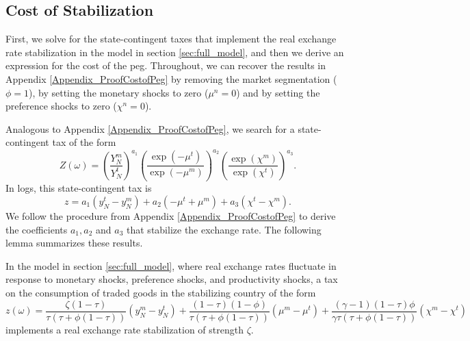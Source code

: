 \subsection{Cost of Stabilization
  \label{Appendix_ProofCostofPeg_FullModel}}

First, we solve for the state-contingent taxes that implement the real
exchange rate stabilization in the model in section
\ref{sec:full_model}, and then we derive an expression for the cost of
the peg. Throughout, we can recover the results in Appendix
\ref{Appendix_ProofCostofPeg} by removing the market segmentation
($\phi = 1$), by setting the monetary shocks to zero ($\mu^n = 0$) and
by setting the preference shocks to zero ($\chi^n = 0$).

Analogous to Appendix \ref{Appendix_ProofCostofPeg}, we search for a
state-contingent tax of the form
\begin{equation*}
  Z(\omega) = \left( \frac{Y_N^m}{Y_N^t} \right)^{a_1}
  \left( \frac{\exp \left( -\mu^t \right)}{\exp \left( -\mu^m \right)}\right)^{a_2} 
  \left( \frac{\exp \left( \chi^m \right)}{\exp \left( \chi^t \right)} \right)^{a_3}.
\end{equation*}
In logs, this state-contingent tax is
\begin{equation*}
  z = a_1 \left( y_N^t - y_N^m \right) + a_2 \left( -\mu^t + \mu^m \right) +
  a_3 \left( \chi^t - \chi^m \right).
\end{equation*}
We follow the procedure from Appendix \ref{Appendix_ProofCostofPeg} to
derive the coefficients $a_1, a_2$ and $a_3$ that stabilize the
exchange rate. The following lemma summarizes these results.
\begin{lemma}
  In the model in section \ref{sec:full_model}, where real exchange
  rates fluctuate in response to monetary shocks, preference shocks,
  and productivity shocks, a tax on the consumption of traded goods in
  the stabilizing country of the form
  \begin{equation*}
    z(\omega) = 
    \frac{\zeta (1 - \tau)}{\tau \left( \tau + \phi (1 - \tau) \right)}
    \left( y_N^m - y_N^t\right) + 
    \frac{(1 - \tau)(1 - \phi)}{\tau \left( \tau + \phi (1 - \tau) \right)}
    \left( \mu^m - \mu^t \right) + 
    \frac{(\gamma - 1)(1 - \tau) \phi}{\gamma \tau \left( \tau + \phi (1 - \tau) \right)}
    \left( \chi^m - \chi^t \right)
  \end{equation*}
  implements a real exchange rate stabilization of strength $\zeta$.
\end{lemma}

